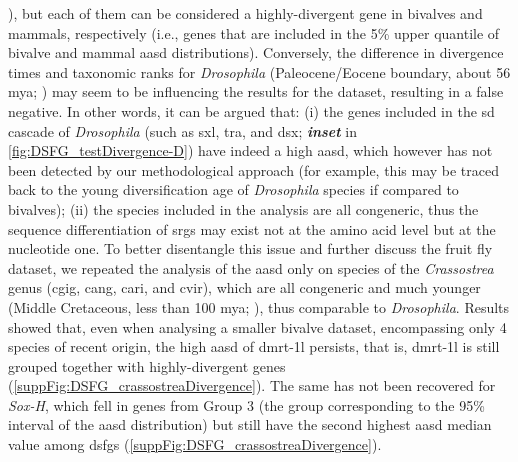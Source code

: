 \textbf{\cite{foster1992evolution}}), but each of them can be considered a highly-divergent gene in bivalves and mammals, respectively (i.e., genes that are included in the 5\% upper quantile of bivalve and mammal \gls{aasd} distributions). Conversely, the difference in divergence times and taxonomic ranks for \textit{Drosophila} (Paleocene/Eocene boundary, about 56 \gls{mya}; \textbf{\cite{russo2013phylogenetic}}) may seem to be influencing the results for the dataset, resulting in a false negative. In other words, it can be argued that: (i) the genes included in the \gls{sd} cascade of \textit{Drosophila} (such as \gls{sxl}, \gls{tra}, and \gls{dsx}; \textbf{\textit{inset}} in \cref{fig:DSFG_testDivergence-D}) have indeed a high \gls{aasd}, which however has not been detected by our methodological approach (for example, this may be traced back to the young diversification age of \textit{Drosophila} species if compared to bivalves); (ii) the species included in the analysis are all congeneric, thus the sequence differentiation of \glspl{srg} may exist not at the amino acid level but at the nucleotide one. To better disentangle this issue and further discuss the fruit fly dataset, we repeated the analysis of the \gls{aasd} only on species of the \textit{Crassostrea} genus (\gls{cgig}, \gls{cang}, \gls{cari}, and \gls{cvir}), which are all congeneric and much younger (Middle Cretaceous, less than 100 \gls{mya}; \textbf{\cite{qi2023construction}}), thus comparable to \textit{Drosophila}. Results showed that, even when analysing a smaller bivalve dataset, encompassing only 4 species of recent origin, the high \gls{aasd} of \gls{dmrt-1l} persists, that is, \gls{dmrt-1l} is still grouped together with highly-divergent genes (\cref{suppFig:DSFG_crassostreaDivergence}). The same has not been recovered for \textit{Sox-H}, which fell in genes from Group 3 (the group corresponding to the 95\% interval of the \gls{aasd} distribution) but still have the second highest \gls{aasd} median value among \glspl{dsfg} (\cref{suppFig:DSFG_crassostreaDivergence}).

